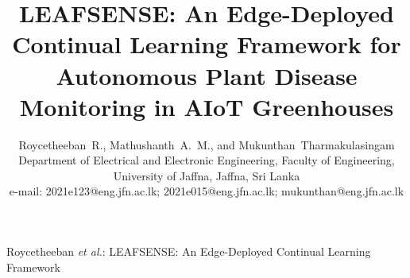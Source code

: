 \documentclass[journal]{IEEEtran}
\begin{document}
\title{LEAFSENSE: An Edge-Deployed Continual Learning Framework for
Autonomous Plant Disease Monitoring in AIoT Greenhouses}

\author{Roycetheeban~R., Mathushanth~A.~M., and Mukunthan~Tharmakulasingam\\[2pt]
\normalfont\normalsize Department of Electrical and Electronic Engineering,
Faculty of Engineering,\\
\normalfont\normalsize University of Jaffna, Jaffna, Sri Lanka\\[1pt]
\normalfont\normalsize e-mail: 2021e123@eng.jfn.ac.lk; 2021e015@eng.jfn.ac.lk;
mukunthan@eng.jfn.ac.lk%
}


%
{Roycetheeban \MakeLowercase{\textit{et al.}}: LEAFSENSE: An Edge-Deployed Continual Learning Framework}

\maketitle
\end{document}
